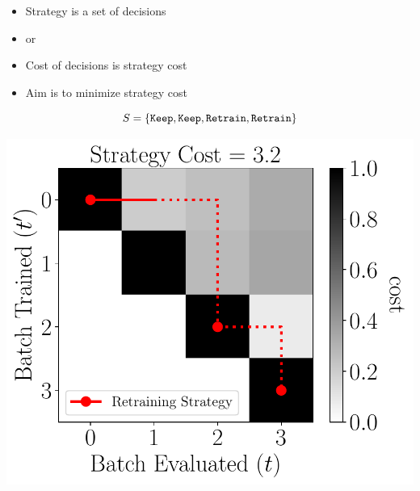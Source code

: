 \documentclass[pdf]{beamer}
\begin{document}
\begin{frame}[fragile]
\begin{tcbraster}[raster columns=2, raster left skip=-0.9cm,raster right skip=-0.9cm,raster before skip=0mm]
\begin{tcolorbox}[nobeforeafter, title=Strategy,boxsep=0.5mm,left=0mm,alert=<2>]
            \setlength{\leftmargini}{0.4cm}
            \begin{itemize}
            \item Strategy is a set of decisions
            \item \retrain or \keep
            \item Cost of decisions is strategy cost
            \item Aim is to minimize strategy cost
        \end{itemize}
        $$S = \left\{\texttt{Keep},\texttt{Keep},\texttt{Retrain},\texttt{Retrain}\right\}$$
        \begin{center}
            \includegraphics[width=.78\textwidth]{figs/strategy.pdf}
            \end{center}
            \end{tcolorbox}
    \end{tcbraster}
\end{frame}
\end{document}

